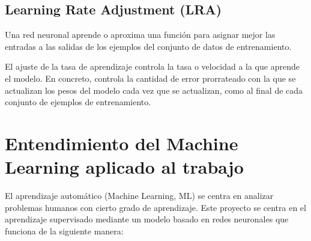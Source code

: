 	\subsection{Learning Rate Adjustment (LRA)}\label{sub:lra}
Una red neuronal aprende o aproxima una función para asignar mejor las entradas a las salidas de los ejemplos del conjunto de datos de entrenamiento.

El ajuste de la tasa de aprendizaje controla la tasa o velocidad a la que aprende el modelo. 
En concreto, controla la cantidad de error prorrateado con la que se actualizan los pesos del modelo cada vez que se actualizan, como al final de cada conjunto de ejemplos de entrenamiento.

\section{Entendimiento del Machine Learning aplicado al trabajo}\label{sec:machine_learning_aplicado}
El aprendizaje automático (Machine Learning, ML) se centra en analizar problemas humanos con cierto grado de aprendizaje. 
Este proyecto se centra en el aprendizaje supervisado mediante un modelo basado en redes neuronales que funciona de la siguiente manera:

